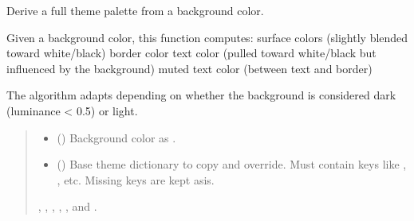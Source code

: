 \documentclass[letterpaper,10pt,english]{sphinxmanual}
\begin{document}

\begin{fulllineitems}
\label{\detokenize{api/colors:colors.derive_theme_from_background}}
\pysigstartsignatures
\pysiglinewithargsret
{}
{\sphinxparamcomma {}}
{}
\pysigstopsignatures
\sphinxAtStartPar
Derive a full theme palette from a background color.

\sphinxAtStartPar
Given a background color, this function computes:
\sphinxhyphen{} surface colors (slightly blended toward white/black)
\sphinxhyphen{} border color
\sphinxhyphen{} text color (pulled toward white/black but influenced by the background)
\sphinxhyphen{} muted text color (between text and border)

\sphinxAtStartPar
The algorithm adapts depending on whether the background is considered dark
(luminance \textless{} 0.5) or light.
\begin{quote}\begin{description}
\begin{itemize}
\item {} 
\sphinxAtStartPar
{} () \textendash{} Background color as .

\item {} 
\sphinxAtStartPar
{} () \textendash{} Base theme dictionary to copy and override. Must contain keys
like , ,  etc. Missing keys are kept as\sphinxhyphen{}is.

\end{itemize}

\sphinxAtStartPar
{}, , , , ,
and .

\sphinxAtStartPar
{}

\end{description}\end{quote}

\end{fulllineitems}
\end{document}
